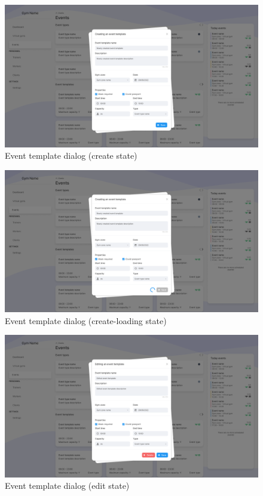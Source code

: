 \documentclass[a4paper, 12pt, oneside]{book}
\begin{document}
\begin{figure}[H]
	\centering
	\includegraphics[width=\textwidth]{assets/ui/EventTemplateCreate.png}
	\caption{Event template dialog (create state)}
\end{figure}
\begin{figure}[H]
	\centering
	\includegraphics[width=\textwidth]{assets/ui/EventTemplateCreateLoading.png}
	\caption{Event template dialog (create-loading state)}
\end{figure}
\begin{figure}[H]
	\centering
	\includegraphics[width=\textwidth]{assets/ui/EventTemplateEdit.png}
	\caption{Event template dialog (edit state)}
\end{figure}
\end{document}
